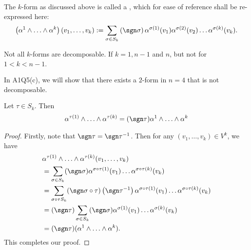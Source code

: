 \documentclass[notoc,notitlepage]{tufte-book}
\begin{document}
\begin{fullwidth}
\begin{defn}\label{defn:decomposable_k_form}
  The $k$-form as discussed above is called a , which for
  ease of reference shall be re-expressed here:
  \begin{equation*}
    \left( \alpha^1 \land \hdots \land \alpha^k \right) ( v_1, \ldots, v_k )
    := \sum_{\sigma \in S_k} \left( \sgn \sigma \right) \alpha^{\sigma(1)}(v_1) \alpha^{\sigma(2)}(v_2) \hdots \alpha^{\sigma(k)}(v_k).
  \end{equation*}
\end{defn}
\end{fullwidth}

\begin{note}
  Not all $k$-forms are decomposable. If $k = 1, n - 1$ and $n$, but not for $1 < k < n - 1$.
\end{note}

In A1Q5(c), we will show that there exists a $2$-form in $n = 4$ that is not decomposable.

\begin{propo}\label{propo:permutation_on_k_forms}
  Let $\tau \in S_k$. Then
  \begin{equation*}
    \alpha^{\tau(1)} \land \hdots \land \alpha^{\tau(k)}
      = ( \sgn \tau ) \alpha^1 \land \hdots \land \alpha^{k}
  \end{equation*}
\end{propo}

\begin{proof}
  Firstly, note that $\sgn \tau = \sgn \tau^{-1}$. Then for any $(v_1, \ldots, v_k) \in V^k$,
  we have
  \begin{align*}
    &\alpha^{\tau(1)} \land \hdots \land \alpha^{\tau(k)} (v_1, \ldots, v_k) \\
    &= \sum_{\sigma \in S_k} (\sgn \sigma) \alpha^{\sigma \circ \tau(1)} (v_1) \hdots \alpha^{\sigma \circ \tau (k)} (v_k) \\
    &= \sum_{\sigma \circ \tau S_k} (\sgn \sigma \circ \tau) \left(\sgn \tau^{-1}\right)
      \alpha^{\sigma \circ \tau(1)} (v_1) \hdots \alpha^{\sigma \circ \tau(k)} (v_k) \\
    &= (\sgn \tau) \sum_{\sigma \in S_k} (\sgn \sigma)
      \alpha^{\sigma(1)} (v_1) \hdots \alpha^{\sigma(k)} (v_k) \\
    &= (\sgn \tau) (\alpha^1 \land \hdots \land \alpha^k).
  \end{align*}
  This completes our proof.
\end{proof}
\end{document}
